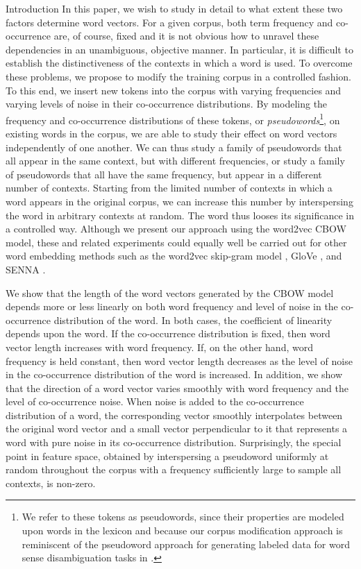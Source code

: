 \documentclass{article} %
\begin{document}
\begin{section}{Introduction}
In this paper, we wish to study in detail to what extent these two
factors determine word vectors.  For a given corpus, both term
frequency and co-occurrence are, of course, fixed and it is not obvious
how to unravel these dependencies in an unambiguous, objective manner.
In particular, it is difficult to establish the distinctiveness of the
contexts in which a word is used.  To overcome these problems, we
propose to modify the training corpus in a controlled fashion.  To
this end, we insert new tokens into the corpus with varying frequencies and
varying levels of noise in their co-occurrence distributions.  By modeling the
frequency and co-occurrence distributions of these tokens, or 
\textit{pseudowords}\footnote{We refer to these tokens as
pseudowords, since their properties are modeled upon words in the
lexicon and because our corpus modification approach is reminiscent of the
pseudoword approach for generating labeled data for word sense disambiguation
tasks in \cite{gale1992work}.}, on existing words in the corpus, we are able to
study their effect on word vectors independently of one another.  We can thus
study a family of pseudowords that all appear in the same context, but with
different frequencies, or study a family of pseudowords that all have the same
frequency, but appear in a different number of contexts.  Starting from the
limited number of contexts in which a word appears in the original corpus, we
can increase this number by interspersing the word in arbitrary contexts at
random.  The word thus looses its significance in a controlled way.  Although
we present our approach using the word2vec CBOW model, these and related
experiments could equally well be carried out for other word embedding methods
such as the word2vec skip-gram model \cite{DistRepns,EfficientEstimation},
GloVe \cite{pennington2014glove}, and SENNA \cite{collobert-2011}.

We show that the length of the word vectors generated by the CBOW model
depends more or less linearly on both word frequency and level of noise
in the co-occurrence distribution of the word.  In both cases, the
coefficient of linearity depends upon the word.  If the co-occurrence
distribution is fixed, then word vector length increases with word
frequency.  If, on the other hand, word frequency is held constant, then
word vector length decreases as the level of noise in the co-occurrence
distribution of the word is increased.  In addition, we show that the direction
of a word vector varies smoothly with word frequency and the level of
co-occurrence noise.  When noise is added to the
co-occurrence distribution of a word, the corresponding vector smoothly
interpolates between the original word vector and a small vector
perpendicular to it that represents a word with pure noise in its
co-occurrence distribution.  Surprisingly, the special point in feature
space, obtained by interspersing a pseudoword uniformly at random
throughout the corpus with a frequency sufficiently large to sample all
contexts, is non-zero.


\end{section}
\end{document}
